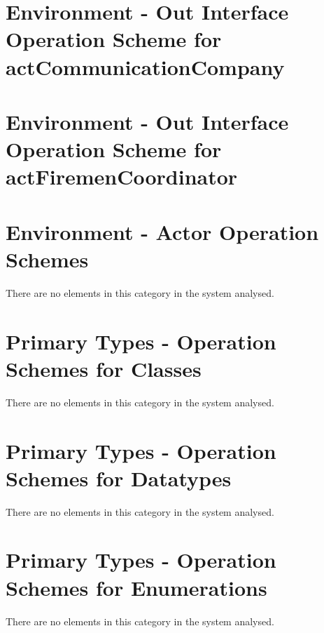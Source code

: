 \section{Environment - Out Interface Operation Scheme for actCommunicationCompany}
\label{OM-EM-OutInterface-OS-actCommunicationCompany}

\section{Environment - Out Interface Operation Scheme for actFiremenCoordinator}
\label{OM-EM-OutInterface-OS-actFiremenCoordinator}



\section{Environment - Actor Operation Schemes}
There are no elements in this category in the system analysed.
		


\section{Primary Types - Operation Schemes for Classes}
There are no elements in this category in the system analysed.




\section{Primary Types - Operation Schemes for Datatypes}
There are no elements in this category in the system analysed.




\section{Primary Types - Operation Schemes for Enumerations}
There are no elements in this category in the system analysed.





